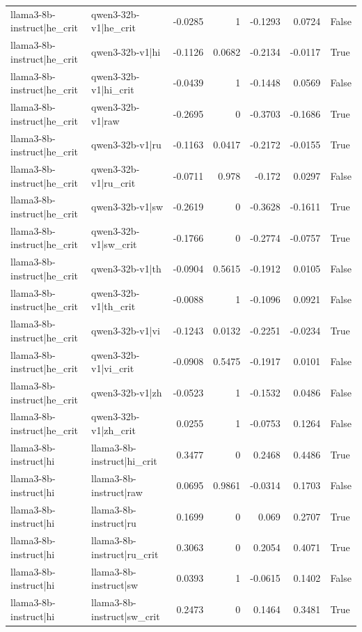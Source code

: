 \begin{table}
\begin{tabular}{l l r r r r l}
llama3-8b-instruct|he_crit & qwen3-32b-v1|he_crit & -0.0285 & 1 & -0.1293 & 0.0724 & False \\
llama3-8b-instruct|he_crit & qwen3-32b-v1|hi & -0.1126 & 0.0682 & -0.2134 & -0.0117 & True \\
llama3-8b-instruct|he_crit & qwen3-32b-v1|hi_crit & -0.0439 & 1 & -0.1448 & 0.0569 & False \\
llama3-8b-instruct|he_crit & qwen3-32b-v1|raw & -0.2695 & 0 & -0.3703 & -0.1686 & True \\
llama3-8b-instruct|he_crit & qwen3-32b-v1|ru & -0.1163 & 0.0417 & -0.2172 & -0.0155 & True \\
llama3-8b-instruct|he_crit & qwen3-32b-v1|ru_crit & -0.0711 & 0.978 & -0.172 & 0.0297 & False \\
llama3-8b-instruct|he_crit & qwen3-32b-v1|sw & -0.2619 & 0 & -0.3628 & -0.1611 & True \\
llama3-8b-instruct|he_crit & qwen3-32b-v1|sw_crit & -0.1766 & 0 & -0.2774 & -0.0757 & True \\
llama3-8b-instruct|he_crit & qwen3-32b-v1|th & -0.0904 & 0.5615 & -0.1912 & 0.0105 & False \\
llama3-8b-instruct|he_crit & qwen3-32b-v1|th_crit & -0.0088 & 1 & -0.1096 & 0.0921 & False \\
llama3-8b-instruct|he_crit & qwen3-32b-v1|vi & -0.1243 & 0.0132 & -0.2251 & -0.0234 & True \\
llama3-8b-instruct|he_crit & qwen3-32b-v1|vi_crit & -0.0908 & 0.5475 & -0.1917 & 0.0101 & False \\
llama3-8b-instruct|he_crit & qwen3-32b-v1|zh & -0.0523 & 1 & -0.1532 & 0.0486 & False \\
llama3-8b-instruct|he_crit & qwen3-32b-v1|zh_crit & 0.0255 & 1 & -0.0753 & 0.1264 & False \\
llama3-8b-instruct|hi & llama3-8b-instruct|hi_crit & 0.3477 & 0 & 0.2468 & 0.4486 & True \\
llama3-8b-instruct|hi & llama3-8b-instruct|raw & 0.0695 & 0.9861 & -0.0314 & 0.1703 & False \\
llama3-8b-instruct|hi & llama3-8b-instruct|ru & 0.1699 & 0 & 0.069 & 0.2707 & True \\
llama3-8b-instruct|hi & llama3-8b-instruct|ru_crit & 0.3063 & 0 & 0.2054 & 0.4071 & True \\
llama3-8b-instruct|hi & llama3-8b-instruct|sw & 0.0393 & 1 & -0.0615 & 0.1402 & False \\
llama3-8b-instruct|hi & llama3-8b-instruct|sw_crit & 0.2473 & 0 & 0.1464 & 0.3481 & True \\

\end{tabular}
\end{table}
